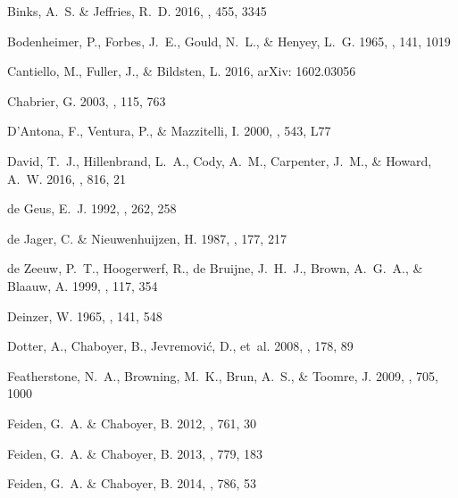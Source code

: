 \documentclass{aa}
\begin{document}
\begin{thebibliography}{71}
{Binks}, A.~S. \& {Jeffries}, R.~D. 2016, \mnras, 455, 3345

{Bodenheimer}, P., {Forbes}, J.~E., {Gould}, N.~L., \& {Henyey}, L.~G. 1965,
  \apj, 141, 1019

Cantiello, M., Fuller, J., \& Bildsten, L. 2016, arXiv: 1602.03056

{Chabrier}, G. 2003, \pasp, 115, 763

{D'Antona}, F., {Ventura}, P., \& {Mazzitelli}, I. 2000, \apj, 543, L77

{David}, T.~J., {Hillenbrand}, L.~A., {Cody}, A.~M., {Carpenter}, J.~M., \&
  {Howard}, A.~W. 2016, \apj, 816, 21

{de Geus}, E.~J. 1992, \aap, 262, 258

{de Jager}, C. \& {Nieuwenhuijzen}, H. 1987, \aap, 177, 217

{de Zeeuw}, P.~T., {Hoogerwerf}, R., {de Bruijne}, J.~H.~J., {Brown}, A.~G.~A.,
  \& {Blaauw}, A. 1999, \aj, 117, 354

{Deinzer}, W. 1965, \apj, 141, 548

Dotter, A., Chaboyer, B., Jevremovi\'{c}, D., {et~al.} 2008, \apjs, 178, 89

{Featherstone}, N.~A., {Browning}, M.~K., {Brun}, A.~S., \& {Toomre}, J. 2009,
  \apj, 705, 1000

{Feiden}, G.~A. \& {Chaboyer}, B. 2012, \apj, 761, 30

{Feiden}, G.~A. \& {Chaboyer}, B. 2013, \apj, 779, 183

{Feiden}, G.~A. \& {Chaboyer}, B. 2014{}, \apj, 786, 53


\end{thebibliography}
\end{document}
